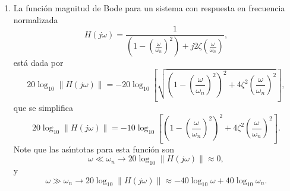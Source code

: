 \begin{enumerate}
\begin{enumerate}
\item  En el caso $\xi >1,$ los coeficientes $c_{1}$ y $c_{2}$ son negativos
y la respuesta al impulso es la diferencia entre dos exponenciales
decrecientes 
\begin{equation}
h_{1}\left( t\right) =M\left( e^{-\left| c_{1}\right| t}-e^{-\left|
c_{1}\right| t}\right) u\left( t\right) .
\end{equation}
En este caso el sistema es sobreamortiguado.

\item  En el caso $\xi =1,$ cuando $c_{1}=c_{2}=-\omega _{n},$ decimos que
el sistema es criticamente amortiguado 
\begin{equation}
h_{1}\left( t\right) =\omega _{n}^{2}te^{-\omega _{n}t}u\left( t\right) .
\end{equation}
\end{enumerate}

\item  La funci\'{o}n magnitud de Bode para un sistema con respuesta en
frecuencia normalizada  
\begin{equation}
H\left( j\omega \right) =\frac{1}{\left( 1-\left( \frac{\omega }{\omega
_{n}}\right) ^{2}\right) +j2\zeta \left( \frac{\omega }{\omega _{n}}\right) 
},
\end{equation}
est\'{a} dada por
\begin{equation}
20\log _{10}\left\| H\left( j\omega \right) \right\| =-20\log _{10}\left[ 
\sqrt{\left( 1-\left( \frac{\omega }{\omega _{n}}\right) ^{2}\right)
^{2}+4\zeta ^{2}\left( \frac{\omega }{\omega _{n}}\right) ^{2}}\right] ,
\end{equation}
que se simplifica
\begin{equation}
20\log _{10}\left\| H\left( j\omega \right) \right\| =-10\log _{10}\left[
\left( 1-\left( \frac{\omega }{\omega _{n}}\right) ^{2}\right) ^{2}+4\zeta
^{2}\left( \frac{\omega }{\omega _{n}}\right) ^{2}\right] .
\end{equation}
Note que las as\'{\i}ntotas para esta funci\'{o}n son
\begin{equation}
\omega \ll \omega _{n}\rightarrow 20\log _{10}\left\| H\left( j\omega
\right) \right\| \approx 0,
\end{equation}
y
\begin{equation}
\omega \gg \omega _{n}\rightarrow 20\log _{10}\left\| H\left( j\omega
\right) \right\| \approx -40\log _{10}\omega +40\log _{10}\omega _{n}.
\end{equation}
\end{enumerate}

